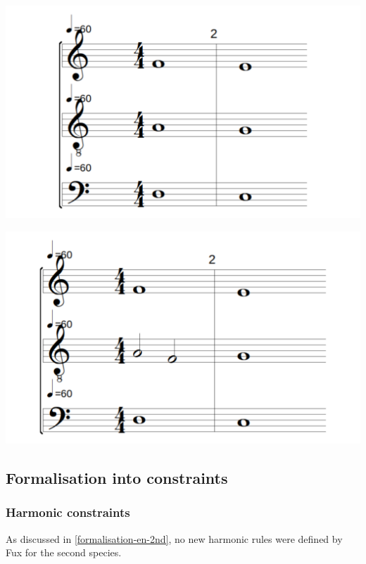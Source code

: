 \begin{enumerate}[wide, label=\bfseries 2.P\arabic*]
\vspace{.5cm}
\begin{minipage}{0.46\textwidth}
    \centering
    \includegraphics[width=\textwidth]{Images/successive-fifths.png}
    \label{fig:successive-fifths-2}
    \end{minipage}
    \hfill
    \begin{minipage}{0.46\textwidth}
      \centering
      \includegraphics[width=\textwidth]{Images/successive-fifths-flanking-a-third.png}
      \label{fig:successive-fifths-2}
\end{minipage}
\end{enumerate}

\subsection{Formalisation into constraints}
\subsubsection{Harmonic constraints}
As discussed in \ref{formalisation-en-2nd}, no new harmonic rules were defined by Fux for the second species.

